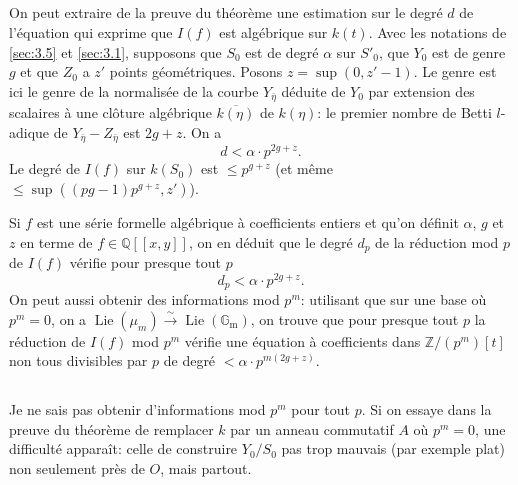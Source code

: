 \documentclass[12pt,a4paper]{article}
\theoremstyle{plain}
\theoremstyle{definition}
\theoremstyle{remark}
\DeclareMathOperator{\Lie}{Lie}
\newcommand{\Gm}{\mathbb{G}_{\mathrm{m}}}
\newcommand{\QQ}{\mathbb{Q}}
\providecommand{\QQ}{\mathbb{Q}}
\providecommand{\ZZ}{\mathbb{Z}}
\providecommand{\Gm}{\mathbb{G}_{\mathrm m}}
\providecommand{\Lie}{\operatorname{Lie}}
\begin{document}
\subsection{}

On peut extraire de la preuve du théorème une estimation sur le degré $d$
de l'équation qui exprime que $I(f)$ est algébrique sur $k(t)$. Avec les notations
de \ref{sec:3.5} et \ref{sec:3.1}, supposons que $S_0$ est de degré $\alpha$ sur $S'_0$, que $Y_0$ est de genre $g$ et
que $Z_0$ a $z'$ points géométriques. Posons $z=\sup(0,z'-1)$. Le genre est ici le
genre de la normalisée de la courbe $Y_{\bar\eta}$ déduite de $Y_0$ par extension des scalaires
à une clôture algébrique $\overline{k(\eta)}$ de $k(\eta)$: le premier nombre de Betti $l$-adique de
$Y_{\bar\eta}-Z_{\bar\eta}$ est $2g+z$. On a
\begin{equation}\label{eq:3.7.1}
d<\alpha\cdot p^{2g+z}.
\end{equation}
Le degré de $I(f)$ sur $k(S_0)$ est $\le p^{g+z}$ (et même
$\le\sup((pg-1)p^{g+z},z')$).

Si $f$ est une série formelle algébrique à coefficients entiers et qu'on définit $\alpha$,
$g$ et $z$ en terme de $f\in\QQ[[x,y]]$, on en déduit que le degré $d_p$ de la réduction
mod $p$ de $I(f)$ vérifie pour presque tout $p$
\begin{equation}\label{eq:3.7.2}
d_p<\alpha\cdot p^{2g+z}.
\end{equation}
On peut aussi obtenir des informations mod $p^m$: utilisant que sur une base
où $p^m=0$, on a $\Lie(\mu_m)\xrightarrow{\sim}\Lie(\Gm)$, on trouve que pour presque tout $p$ la
réduction de $I(f)$ mod $p^m$ vérifie une équation à coefficients dans $\ZZ/(p^m)[t]$ non
tous divisibles par $p$ de degré $<\alpha\cdot p^{m(2g+z)}$.

\subsection{}

Je ne sais pas obtenir d'informations mod $p^m$ pour tout $p$. Si on essaye dans
la preuve du théorème de remplacer $k$ par un anneau commutatif $A$ où $p^m=0$,
une difficulté apparaît: celle de construire $Y_0/S_0$ pas trop mauvais (par exemple
plat) non seulement près de $O$, mais partout.

\subsection{}
\end{document}
